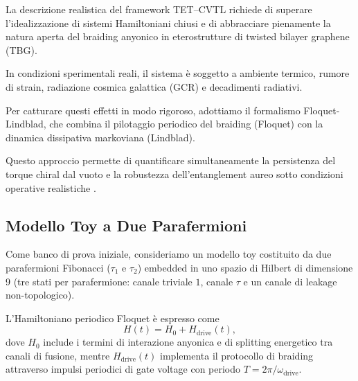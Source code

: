\documentclass[11pt,a4paper]{article}
\let\oldcite\cite
\renewcommand{\cite}{\protect\oldcite}
\theoremstyle{plain}
\theoremstyle{definition}
\begin{document}
La descrizione realistica del framework TET--CVTL richiede di superare l'idealizzazione di sistemi Hamiltoniani chiusi e di abbracciare pienamente la natura aperta del braiding anyonico in eterostrutture di twisted bilayer graphene (TBG). 

\vspace{0.4cm}


In condizioni sperimentali reali, il sistema è soggetto a ambiente termico, rumore di strain, radiazione cosmica galattica (GCR) e decadimenti radiativi. 

\vspace{0.4cm}


Per catturare questi effetti in modo rigoroso, adottiamo il formalismo Floquet-Lindblad, che combina il pilotaggio periodico del braiding (Floquet) con la dinamica dissipativa markoviana (Lindblad). 

\vspace{0.4cm}


Questo approccio permette di quantificare simultaneamente la persistenza del torque chiral dal vuoto e la robustezza dell'entanglement aureo sotto condizioni operative realistiche \cite{Nayak2008, Xu2024}.



\vspace{0.4cm}



\subsection{Modello Toy a Due Parafermioni}

Come banco di prova iniziale, consideriamo un modello toy costituito da due parafermioni Fibonacci ($\tau_1$ e $\tau_2$) embedded in uno spazio di Hilbert di dimensione 9 (tre stati per parafermione: canale triviale $1$, canale $\tau$ e un canale di leakage non-topologico). 

\vspace{0.5cm}


L'Hamiltoniano periodico Floquet è espresso come
\begin{equation}
H(t) = H_0 + H_{\text{drive}}(t),
\label{eq:H_floquet}
\end{equation}
dove $H_0$ include i termini di interazione anyonica e di splitting energetico tra canali di fusione, mentre $H_{\text{drive}}(t)$ implementa il protocollo di braiding attraverso impulsi periodici di gate voltage con periodo $T = 2\pi / \omega_{\text{drive}}$.
\end{document}
